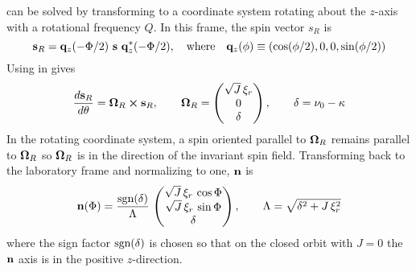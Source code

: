  can be solved by transforming to a coordinate system rotating about the $z$-axis with a
rotational frequency $Q$. In this frame, the spin vector $s_R$ is
\begin{equation}
  {\bf s}_R = {\bf q}_z(-\Phi/2) \,\, {\bf s} \,\, {\bf q}_z^*(-\Phi/2), \quad \text{where} \quad
  {\bf q}_z(\phi) \equiv (\cos (\phi/2), 0, 0, \sin (\phi/2))
  \label{rqsq}
\end{equation}
Using  in  gives
\begin{equation}
  \frac{d {\bf s}_R}{d \theta} = {\bf \Omega}_R \mathbin{\boldsymbol{\times}} {\bf s}_R, \qquad
  {\bf \Omega}_R = \begin{pmatrix}
    \sqrt{J} \, \xi_r \\
    0 \\
    \delta 
  \end{pmatrix},
  \qquad
  \delta = \nu_0 - \kappa
  \label{stos2}
\end{equation}
In the rotating coordinate system, a spin oriented parallel to ${\bf \Omega}_R$ remains parallel to
${\bf \Omega}_R$ so ${\bf \Omega}_R$ is in the direction of the invariant spin field. Transforming back
to the laboratory frame and normalizing to one, ${\bf n}$ is
\begin{equation}
  {\bf n} (\Phi) = \frac{{\text{sgn}}(\delta)}{\Lambda} \, 
  \begin{pmatrix}
    \sqrt{J} \, \xi_r \, \cos \Phi \\
    \sqrt{J} \, \xi_r \, \sin \Phi \\
    \delta
  \end{pmatrix},
  \qquad
  \Lambda = \sqrt{\delta^2 + J \, \xi_r^2}
  \label{nsdl}
\end{equation}
where the sign factor ${\text{sgn}}(\delta)$ is chosen so that on the closed orbit with $J = 0$ the ${\bf n}$
axis is in the positive $z$-direction.

